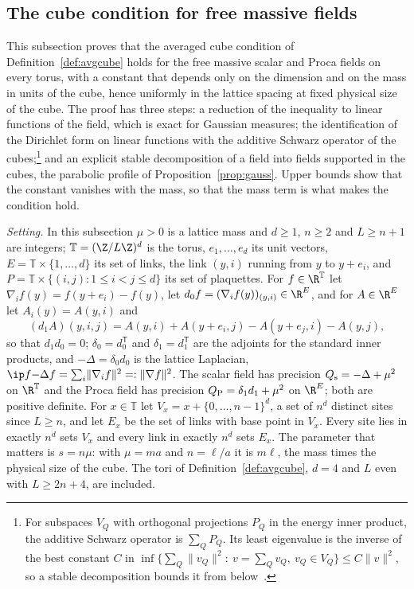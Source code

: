\subsection{The cube condition for free massive fields}\label{ssec:fffree}

This subsection proves that the averaged cube condition of
Definition~\ref{def:avgcube} holds for the free massive scalar and Proca
fields on every torus, with a constant that depends only on the dimension and
on the mass in units of the cube, hence uniformly in the lattice spacing at
fixed physical size of the cube. The proof has three steps: a reduction of
the inequality to linear functions of the field, which is exact for Gaussian
measures; the identification of the Dirichlet form on linear functions with
the additive Schwarz operator of the cubes;\footnote{For subspaces $V_Q$ with orthogonal projections $P_Q$ in the energy inner product, the additive Schwarz operator is $\sum_QP_Q$. Its least eigenvalue is the inverse of the best constant $C$ in $\inf\{\sum_Q\lVert v_Q\rVert^2:\ v=\sum_Qv_Q,\ v_Q\in V_Q\}\le C\lVert v\rVert^2$, so a stable decomposition bounds it from below~\cite{Lio88}.} and an explicit stable
decomposition of a field into fields supported in the cubes, the parabolic
profile of Proposition~\ref{prop:gauss}. Upper bounds show that the constant
vanishes with the mass, so that the mass term is what makes the condition
hold.

\emph{Setting.} In this subsection $\mu>0$ is a lattice mass and $d\ge1$,
$n\ge2$ and $L\ge n+1$ are integers; $\mathbb T=(\Z/L\Z)^d$ is the torus,
$e_1,\dots,e_d$ its unit vectors, $E=\mathbb T\times\{1,\dots,d\}$ its set
of links, the link $(y,i)$ running from $y$ to $y+e_i$, and $P=\mathbb T
\times\{(i,j):1\le i<j\le d\}$ its set of plaquettes. For $f\in\R^{\mathbb
T}$ let $\nabla_if(y)=f(y+e_i)-f(y)$, let $d_0f=(\nabla_if(y))_{(y,i)}\in
\R^E$, and for $A\in\R^E$ let $A_i(y)=A(y,i)$ and
\[
(d_1A)(y,i,j)=A(y,i)+A(y+e_i,j)-A(y+e_j,i)-A(y,j),
\]
so that $d_1d_0=0$; $\delta_0=d_0^{\mathsf T}$ and $\delta_1=d_1^{\mathsf T}$
are the adjoints for the standard inner products, and $-\Delta=\delta_0d_0$
is the lattice Laplacian, $\ip f{-\Delta f}=\sum_i\lVert\nabla_if\rVert^2=:
\lVert\nabla f\rVert^2$. The scalar field has precision
$Q_{\rm s}=-\Delta+\mu^2$ on $\R^{\mathbb T}$ and the Proca field has
precision $Q_{\rm P}=\delta_1d_1+\mu^2$ on $\R^E$; both are positive
definite. For $x\in\mathbb T$ let $V_x=x+\{0,\dots,n-1\}^d$, a set of $n^d$
distinct sites since $L\ge n$, and let $E_x$ be the set of links with base
point in $V_x$. Every site lies in exactly $n^d$ sets $V_x$ and every link
in exactly $n^d$ sets $E_x$. The parameter that matters is $s=n\mu$: with
$\mu=ma$ and $n=\ell/a$ it is $m\ell$, the mass times the physical size of
the cube. The tori of Definition~\ref{def:avgcube}, $d=4$ and $L$ even with
$L\ge2n+4$, are included.


